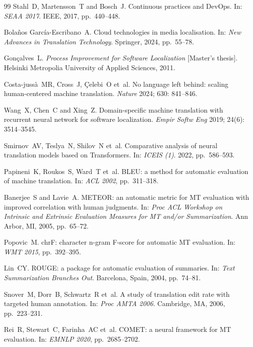 \documentclass[Afour,sagev,times,doublespace]{sagej}
\begin{document}
\begin{thebibliography}{99}
Stahl~D, Martensson~T and Bosch~J.
\newblock Continuous practices and DevOps.
\newblock In: \emph{SEAA 2017}. IEEE, 2017, pp.~440--448.

Bola\~{n}os Garc\'{i}a-Escribano~A.
\newblock Cloud technologies in media localisation.
\newblock In: \emph{New Advances in Translation Technology}. Springer, 2024, pp.~55--78.

Gon\c{c}alves~L.
\newblock \emph{Process Improvement for Software Localization} [Master's thesis].
\newblock Helsinki Metropolia University of Applied Sciences, 2011.

Costa-juss\`{a}~MR, Cross~J, \c{C}elebi~O et~al.
\newblock No language left behind: scaling human-centered machine translation.
\newblock \emph{Nature} 2024; 630: 841--846.

Wang~X, Chen~C and Xing~Z.
\newblock Domain-specific machine translation with recurrent neural network for software localization.
\newblock \emph{Empir Softw Eng} 2019; 24(6): 3514--3545.

Smirnov~AV, Teslya~N, Shilov~N et~al.
\newblock Comparative analysis of neural translation models based on Transformers.
\newblock In: \emph{ICEIS (1)}. 2022, pp.~586--593.

Papineni~K, Roukos~S, Ward~T et~al.
\newblock BLEU: a method for automatic evaluation of machine translation.
\newblock In: \emph{ACL 2002}, pp.~311--318.

Banerjee~S and Lavie~A.
\newblock METEOR: an automatic metric for MT evaluation with improved correlation with human judgments.
\newblock In: \emph{Proc ACL Workshop on Intrinsic and Extrinsic Evaluation Measures for MT and/or Summarization}. Ann Arbor, MI, 2005, pp.~65--72.

Popovic~M.
\newblock chrF: character n-gram F-score for automatic MT evaluation.
\newblock In: \emph{WMT 2015}, pp.~392--395.

Lin~CY.
\newblock ROUGE: a package for automatic evaluation of summaries.
\newblock In: \emph{Text Summarization Branches Out}. Barcelona, Spain, 2004, pp.~74--81.

Snover~M, Dorr~B, Schwartz~R et~al.
\newblock A study of translation edit rate with targeted human annotation.
\newblock In: \emph{Proc AMTA 2006}. Cambridge, MA, 2006, pp.~223--231.

Rei~R, Stewart~C, Farinha~AC et~al.
\newblock COMET: a neural framework for MT evaluation.
\newblock In: \emph{EMNLP 2020}, pp.~2685--2702.


\end{thebibliography}
\end{document}

